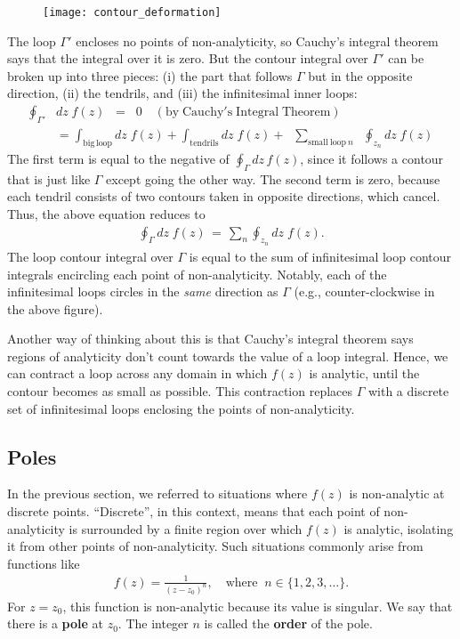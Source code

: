 \documentclass[10pt,a4paper]{article}
\begin{document}
\begin{figure}[H]
  \centering\texttt{[image: contour\_deformation]}
\end{figure}

The loop $\Gamma'$ encloses no points of non-analyticity, so Cauchy's
integral theorem says that the integral over it is zero.  But the
contour integral over $\Gamma'$ can be broken up into three pieces:
(i) the part that follows $\Gamma$ but in the opposite direction, (ii)
the tendrils, and (iii) the infinitesimal inner loops:
\begin{align}
  \oint_{\Gamma'}& dz\; f(z)
\;\;= \;\; 0 \quad (\mathrm{by}\;\mathrm{Cauchy's}\;\mathrm{Integral}\;\mathrm{Theorem}) \\
&= \int_{\mathrm{big}\,\mathrm{loop}} dz\; f(z) + \int_{\mathrm{tendrils}} dz\; f(z) +\; \;\sum_{\mathrm{small~loop}~n}\;\; \oint_{z_n} dz\; f(z)
\end{align}
The first term is equal to the negative of $\oint_\Gamma dz \, f(z)$,
since it follows a contour that is just like $\Gamma$ except going the
other way.  The second term is zero, because each tendril consists of
two contours taken in opposite directions, which cancel.  Thus, the
above equation reduces to
\begin{align}
  \oint_\Gamma dz\; f(z) \,=\, \sum_n \oint_{z_n} dz\; f(z).
\end{align}
The loop contour integral over $\Gamma$ is equal to the sum of
infinitesimal loop contour integrals encircling each point of
non-analyticity. Notably, each of the infinitesimal loops circles in
the \textit{same} direction as $\Gamma$ (e.g., counter-clockwise in
the above figure).

Another way of thinking about this is that Cauchy's integral theorem
says regions of analyticity don't count towards the value of a loop
integral.  Hence, we can contract a loop across any domain in which
$f(z)$ is analytic, until the contour becomes as small as possible.
This contraction replaces $\Gamma$ with a discrete set of
infinitesimal loops enclosing the points of non-analyticity.

\subsection{Poles}
\label{poles}

In the previous section, we referred to situations where $f(z)$ is
non-analytic at discrete points.  ``Discrete'', in this context, means
that each point of non-analyticity is surrounded by a finite region
over which $f(z)$ is analytic, isolating it from other points of
non-analyticity. Such situations commonly arise from functions like
\begin{align}
  f(z) = \frac{1}{(z-z_0)^n}, \quad \mathrm{where}\;\; n\in\{1,2,3,\dots\}.
\end{align}
For $z = z_0$, this function is non-analytic because its value is
singular.  We say that there is a \textbf{pole} at $z_0$.  The integer
$n$ is called the \textbf{order} of the pole.
\end{document}
